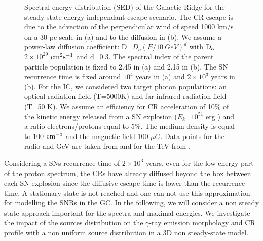 \documentclass[a4paper,fleqn,usenatbib]{mnras}
\begin{document}
\begin{figure}
\centering
{}
\caption{Spectral energy distribution (SED) of the Galactic Ridge for the steady-state energy independant escape scenario. The CR escape is due to the advection of the perpendicular wind of speed 1000 km/s on a 30 pc scale in (a) and to the diffusion in (b). We assume a power-law diffusion coefficient: D=$D_o {\left(E/10 \ GeV \right)}^{d}$ with $\rm D_o$=$2 \times 10^{29}$ $\rm cm^2s^{-1}$ and d=0.3. The spectral index of the parent particle population is fixed to 2.45 in (a) and 2.15 in (b). The SN recurrence time is fixed around ${10}^4$ years in (a) and $2 \times 10^3$ years in (b). For the IC, we considered two target photon populations: an optical radiation field (T=5000K) and far infrared radiation field (T=50 K). We assume an efficiency for CR acceleration of 10\% of the kinetic energy released from a SN explosion ($E_k$=$10^{51}$ erg \citep{2011Ap&SS.336..257R}) and a ratio electrons/protons equal to 5\%. The medium density is equal to 100 $ \rm cm^{-3}$ and the magnetic field 100 $\mu G$. Data points for the radio and GeV are taken from \citet{2014arXiv1410.1678M} and for the TeV from \citet{2006Natur.439..695A}.}
\label{SED}
\end{figure}


Considering a SNs recurrence time of $2 \times 10^3$ years, even for the low energy part of the proton spectrum, the CRs have already diffused beyond the box between each SN explosion since the diffusive escape time is lower than the recurrence time. A stationary state is not reached and one can not use this approximation for modelling the SNRs in the GC. In the following, we will consider a non steady state approach important for the spectra and maximal energies. We investigate the impact of the sources distribution on the $\gamma$-ray emission morphology and CR profile with a non uniform source distribution in a 3D non steady-state model.
\end{document}
